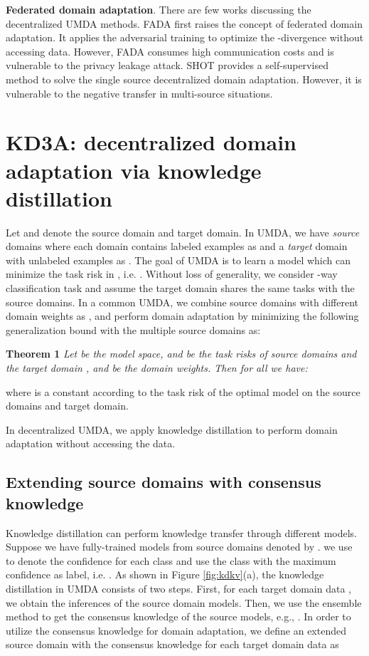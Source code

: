 \documentclass{article}
\begin{document}
\textbf{Federated domain adaptation}. There are few works discussing the decentralized UMDA methods. FADA \citep{DBLP:conf/iclr/PengHZS20} first raises the concept of federated domain adaptation. It applies the adversarial training to optimize the -divergence without accessing data. However, FADA consumes high communication costs and is vulnerable to the privacy leakage attack. SHOT \cite{DBLP:conf/icml/LiangHF20} provides a self-supervised method to solve the single
source decentralized domain adaptation. However, it is vulnerable to the negative transfer in multi-source situations.
 \section{KD3A: decentralized domain adaptation via knowledge distillation}
Let  and  denote the source domain and target domain. In UMDA, we have  \textit{source} domains  where each domain contains  labeled examples as  and a \textit{target} domain  with  unlabeled examples as . The goal of UMDA is to learn a model  which can minimize the task risk  in , i.e. . Without loss of generality, we consider -way classification task and assume the target domain shares the same tasks with the source domains. In a common UMDA, we combine  source domains with different domain weights as , and perform domain adaptation by minimizing the following generalization bound \citep{DBLP:journals/ml/Ben-DavidBCKPV10,DBLP:conf/iclr/0002ZWCMG18} with the multiple source domains as:

\textbf{Theorem 1} \textit{Let  be the model space,  and  be the task risks of source domains  and the target domain , and  be the domain weights. Then for all  we have:}

where  is a constant according to the task risk of the optimal model on the source domains and target domain. 

In decentralized UMDA, we apply knowledge distillation to perform domain adaptation without accessing the data.
\subsection{Extending source domains with consensus knowledge}
Knowledge distillation can perform knowledge transfer through different models. Suppose we have  fully-trained models from  source domains denoted by . we use  to denote the confidence for each class and use the class with the maximum confidence as label, i.e. . As shown in Figure \ref{fig:kdkv}(a), the knowledge distillation in UMDA consists of two steps. First, for each target domain data , we obtain the inferences of the source domain models. Then, we use the ensemble method to get the consensus knowledge of the source models, e.g., . In order to utilize the consensus knowledge for domain adaptation, we define an extended source domain  with the consensus knowledge  for each target domain data  as
\end{document}
